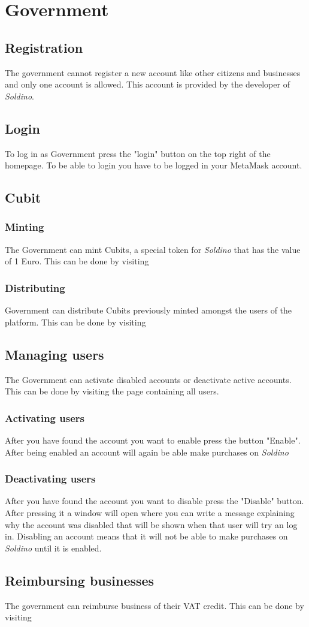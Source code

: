 \section{Government}
	\subsection{Registration}
	The government cannot register a new account like other citizens and 
	businesses and only one account is allowed. This account is provided 
	by the developer of \textit{Soldino}.
	\subsection{Login}
	To log in as Government press the "login" button on the top right of the 
	homepage. To be able to 
	login you have to be logged in your MetaMask account.
	\subsection{Cubit}
		\subsubsection{Minting}
		The Government can mint Cubits, a special token for \textit{Soldino} 
		that has the value of 1 Euro. This can be done by visiting 
		
		\subsubsection{Distributing}
		Government can distribute Cubits previously minted amongst the users of 
		the platform. This can be done by visiting 
		
	\subsection{Managing users}
	The Government can activate disabled accounts or deactivate active accounts.
	This can be done by visiting the page containing all users.
		\subsubsection{Activating users}
		After you have found the account you want to enable press the button 
		"Enable". After being enabled an account will again be able make purchases
		on \textit{Soldino}
		
		\subsubsection{Deactivating users}
		After you have found the account you want to disable press the 
		"Disable" button. After pressing it a window will open where you can 
		write a	message explaining why the account was disabled that will be 
		shown when that user will try an log in. Disabling an account 
		means that it will not be able to make purchases on \textit{Soldino} 
		until it is enabled.
		
	\subsection{Reimbursing businesses}
	The government can reimburse business of their VAT credit. This can be done 
	by visiting